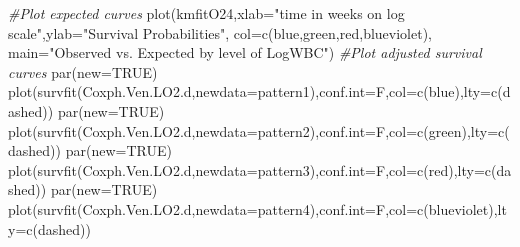 \documentclass[
]{article}
\newenvironment{Shaded}{\begin{snugshade}}{\end{snugshade}}
\newcommand{\AttributeTok}[1]{\textcolor[rgb]{0.77,0.63,0.00}{#1}}
\newcommand{\CommentTok}[1]{\textcolor[rgb]{0.56,0.35,0.01}{\textit{#1}}}
\newcommand{\ConstantTok}[1]{\textcolor[rgb]{0.00,0.00,0.00}{#1}}
\newcommand{\FunctionTok}[1]{\textcolor[rgb]{0.00,0.00,0.00}{#1}}
\newcommand{\NormalTok}[1]{#1}
\newcommand{\StringTok}[1]{\textcolor[rgb]{0.31,0.60,0.02}{#1}}
\begin{document}
\begin{Shaded}
\begin{Highlighting}[]
\CommentTok{\#Plot expected curves }
\FunctionTok{plot}\NormalTok{(kmfitO24,}\AttributeTok{xlab=}\StringTok{"time in weeks on log scale"}\NormalTok{,}\AttributeTok{ylab=}\StringTok{"Survival Probabilities"}\NormalTok{, }\AttributeTok{col=}\FunctionTok{c}\NormalTok{(}\StringTok{\textquotesingle{}blue\textquotesingle{}}\NormalTok{,}\StringTok{\textquotesingle{}green\textquotesingle{}}\NormalTok{,}\StringTok{\textquotesingle{}red\textquotesingle{}}\NormalTok{,}\StringTok{\textquotesingle{}blueviolet\textquotesingle{}}\NormalTok{), }\AttributeTok{main=}\StringTok{"Observed vs. Expected by level of LogWBC"}\NormalTok{)}
\CommentTok{\#Plot adjusted survival curves}
\FunctionTok{par}\NormalTok{(}\AttributeTok{new=}\ConstantTok{TRUE}\NormalTok{)}
\FunctionTok{plot}\NormalTok{(}\FunctionTok{survfit}\NormalTok{(Coxph.Ven.LO2.d,}\AttributeTok{newdata=}\NormalTok{pattern1),}\AttributeTok{conf.int=}\NormalTok{F,}\AttributeTok{col=}\FunctionTok{c}\NormalTok{(}\StringTok{\textquotesingle{}blue\textquotesingle{}}\NormalTok{),}\AttributeTok{lty=}\FunctionTok{c}\NormalTok{(}\StringTok{\textquotesingle{}dashed\textquotesingle{}}\NormalTok{))}
\FunctionTok{par}\NormalTok{(}\AttributeTok{new=}\ConstantTok{TRUE}\NormalTok{)  }
\FunctionTok{plot}\NormalTok{(}\FunctionTok{survfit}\NormalTok{(Coxph.Ven.LO2.d,}\AttributeTok{newdata=}\NormalTok{pattern2),}\AttributeTok{conf.int=}\NormalTok{F,}\AttributeTok{col=}\FunctionTok{c}\NormalTok{(}\StringTok{\textquotesingle{}green\textquotesingle{}}\NormalTok{),}\AttributeTok{lty=}\FunctionTok{c}\NormalTok{(}\StringTok{\textquotesingle{}dashed\textquotesingle{}}\NormalTok{))}
\FunctionTok{par}\NormalTok{(}\AttributeTok{new=}\ConstantTok{TRUE}\NormalTok{)}
\FunctionTok{plot}\NormalTok{(}\FunctionTok{survfit}\NormalTok{(Coxph.Ven.LO2.d,}\AttributeTok{newdata=}\NormalTok{pattern3),}\AttributeTok{conf.int=}\NormalTok{F,}\AttributeTok{col=}\FunctionTok{c}\NormalTok{(}\StringTok{\textquotesingle{}red\textquotesingle{}}\NormalTok{),}\AttributeTok{lty=}\FunctionTok{c}\NormalTok{(}\StringTok{\textquotesingle{}dashed\textquotesingle{}}\NormalTok{))}
\FunctionTok{par}\NormalTok{(}\AttributeTok{new=}\ConstantTok{TRUE}\NormalTok{)}
\FunctionTok{plot}\NormalTok{(}\FunctionTok{survfit}\NormalTok{(Coxph.Ven.LO2.d,}\AttributeTok{newdata=}\NormalTok{pattern4),}\AttributeTok{conf.int=}\NormalTok{F,}\AttributeTok{col=}\FunctionTok{c}\NormalTok{(}\StringTok{\textquotesingle{}blueviolet\textquotesingle{}}\NormalTok{),}\AttributeTok{lty=}\FunctionTok{c}\NormalTok{(}\StringTok{\textquotesingle{}dashed\textquotesingle{}}\NormalTok{))}

\end{Highlighting}
\end{Shaded}
\end{document}
